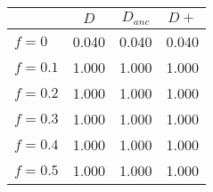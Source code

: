 \begin{tabular}{lccc}
\toprule
 & $D$ & $D_{anc}$ & $D+$ \\
\midrule
$f = 0$ & 0.040 & 0.040 & 0.040 \\
$f = 0.1$ & 1.000 & 1.000 & 1.000 \\
$f = 0.2$ & 1.000 & 1.000 & 1.000 \\
$f = 0.3$ & 1.000 & 1.000 & 1.000 \\
$f = 0.4$ & 1.000 & 1.000 & 1.000 \\
$f = 0.5$ & 1.000 & 1.000 & 1.000 \\
\bottomrule
\end{tabular}
